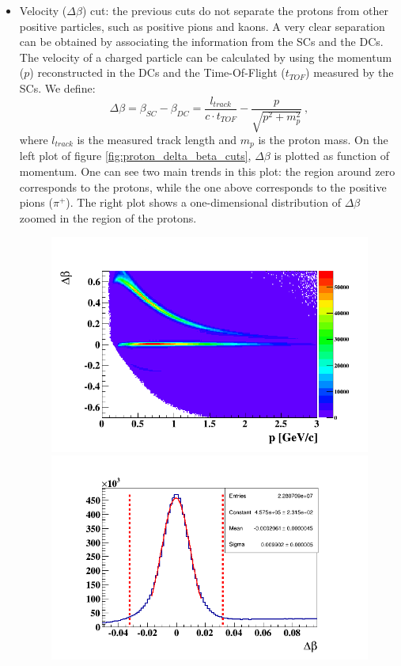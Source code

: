 \begin{itemize}
\item Velocity ($\Delta \beta$) cut: the previous cuts do not separate the protons from other positive particles, such as positive pions and kaons. A very clear separation can be obtained by associating the information from the SCs and the DCs. The velocity of a charged particle can be calculated by using the momentum ($p$) reconstructed in the DCs and the Time-Of-Flight ($t_{TOF}$) measured by the SCs. We define:
\begin{equation}
\Delta \beta = \beta_{SC} - \beta_{DC} = \frac{l_{track}}{c \cdot t_{TOF}} - \frac{p}{\sqrt{p^{2} + m^{2}_{p}}}~,
\end{equation}
where $l_{track}$ is the measured track length and $m_{p}$ is the proton mass. On the left plot of figure \ref{fig:proton_delta_beta_cuts}, $\Delta \beta$ is plotted as function of momentum. One can see two main trends in this plot: the region around zero corresponds to the protons, while the one above corresponds to the positive pions ($\pi^{+}$). The right plot shows a one-dimensional distribution of $\Delta \beta$ zoomed in the region of the protons.
\begin{figure}[tbp]
\hspace{-0.2in}
\includegraphics[scale=0.36]{fig_analysis/prot_DeltaBeta_p.png}
\hspace{-0.2in}
\includegraphics[scale=0.36]{fig_analysis/prot_DeltaBeta.png}

\end{figure}
\end{itemize}
